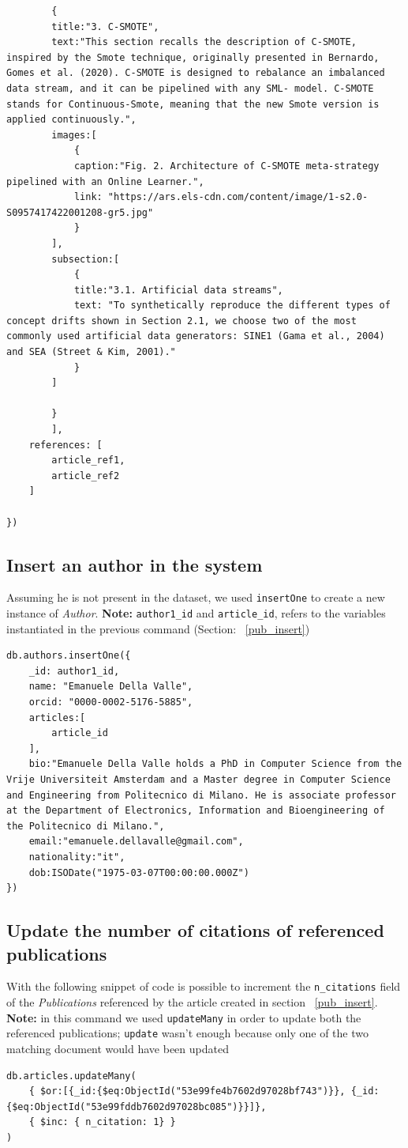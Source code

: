 \documentclass{Configuration_Files/PoliMi3i_thesis}
\begin{document}
\begin{lstlisting}
		{
		title:"3. C-SMOTE",
		text:"This section recalls the description of C-SMOTE, inspired by the Smote technique, originally presented in Bernardo, Gomes et al. (2020). C-SMOTE is designed to rebalance an imbalanced data stream, and it can be pipelined with any SML- model. C-SMOTE stands for Continuous-Smote, meaning that the new Smote version is applied continuously.",
		images:[
			{
			caption:"Fig. 2. Architecture of C-SMOTE meta-strategy pipelined with an Online Learner.",
			link: "https://ars.els-cdn.com/content/image/1-s2.0-S0957417422001208-gr5.jpg"
			}
		],
		subsection:[
			{
			title:"3.1. Artificial data streams",
			text: "To synthetically reproduce the different types of concept drifts shown in Section 2.1, we choose two of the most commonly used artificial data generators: SINE1 (Gama et al., 2004) and SEA (Street & Kim, 2001)."
			}
		]

		}
		],
	references: [
		article_ref1,
		article_ref2
	]

})
\end{lstlisting}


\subsection{Insert an author in the system}
Assuming he is not present in the dataset, we used \verb |insertOne| to create a new instance of \emph{Author}.\newline
\textbf{Note:} \verb |author1_id| and \verb|article_id|, refers to the variables instantiated in the previous
command (Section: ~\ref{pub_insert})
\begin{lstlisting}
db.authors.insertOne({
	_id: author1_id,
	name: "Emanuele Della Valle",
	orcid: "0000-0002-5176-5885",
	articles:[
		article_id
	],
	bio:"Emanuele Della Valle holds a PhD in Computer Science from the Vrije Universiteit Amsterdam and a Master degree in Computer Science and Engineering from Politecnico di Milano. He is associate professor at the Department of Electronics, Information and Bioengineering of the Politecnico di Milano.",
	email:"emanuele.dellavalle@gmail.com",
	nationality:"it",
	dob:ISODate("1975-03-07T00:00:00.000Z")
})
\end{lstlisting}

\subsection{Update the number of citations of referenced publications}
With the following snippet of code is possible to increment the \verb |n_citations| field of the \emph{Publications}
referenced by the article created in section ~\ref{pub_insert}.\newline
\textbf{Note:} in this command we used \verb |updateMany| in order to update both the referenced publications; \verb |update|
wasn't enough because only one of the two matching document would have been updated\\
\begin{lstlisting}
db.articles.updateMany(
	{ $or:[{_id:{$eq:ObjectId("53e99fe4b7602d97028bf743")}}, {_id:{$eq:ObjectId("53e99fddb7602d97028bc085")}}]},
	{ $inc: { n_citation: 1} }
)
\end{lstlisting}
\end{document}
